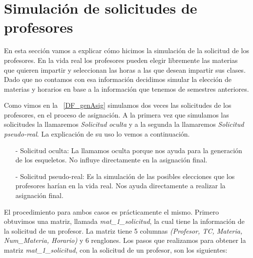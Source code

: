 \section{Simulación de solicitudes de profesores} \label{SimSolicitudesProfesores}

En esta sección vamos a explicar cómo hicimos la simulación de la solicitud de los profesores. En la vida real los profesores pueden elegir libremente las materias que quieren impartir y seleccionan las horas a las que desean impartir sus clases. Dado que no contamos con esa información decidimos simular la elección de materias y horarios en base a la información que tenemos de semestres anteriores.

Como vimos en la \figurename{~\ref{DF_genAsig}} simulamos dos veces las solicitudes de los profesores, en el proceso de asignación. A la primera vez que simulamos las solicitudes la llamaremos \textit{Solicitud oculta} y a la segunda la llamaremos \textit{Solicitud pseudo-real}. La explicación de su uso lo vemos a continuación.

\begin{itemize}
\item[-] Solicitud oculta: La llamamos oculta porque nos ayuda para la generación de los esqueletos. No influye directamente en la asignación final.

\item[-] Solicitud pseudo-real: Es la simulación de las posibles elecciones que los profesores harían en la vida real. Nos ayuda directamente a realizar la asignación final.
\end{itemize}

El procedimiento para ambos casos es prácticamente el mismo. Primero obtuvimos una matriz, llamada \textit{mat\_1\_solicitud}, la cual tiene la información de la solicitud de un profesor. La matriz tiene 5 columnas \textit{(Profesor, TC, Materia, Num\_Materia, Horario)} y 6 renglones. Los pasos que realizamos para obtener la matriz \textit{mat\_1\_solicitud}, con la solicitud de un profesor, son los siguientes:

